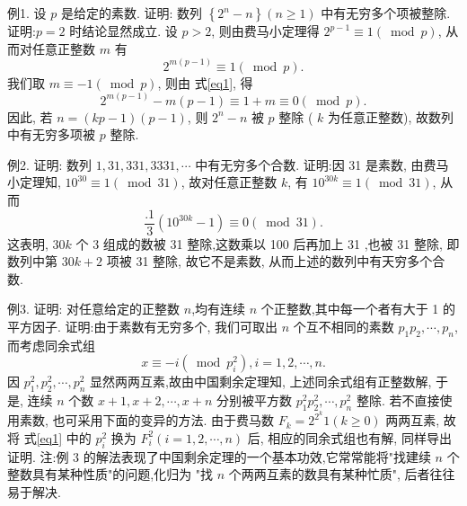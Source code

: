 例1. 设 $p$ 是给定的素数.
证明: 数列 $\left\{2^n-n\right\}(n \geqslant 1)$ 中有无穷多个项被整除.
证明:$p=2$ 时结论显然成立.
设 $p>2$, 则由费马小定理得 $2^{p-1} \equiv 1(\bmod p)$, 从而对任意正整数 $m$ 有
$$
2^{m(p-1)} \equiv 1(\bmod p) . \label{eq1}
$$
我们取 $m \equiv-1(\bmod p)$, 则由 式\ref{eq1}, 得
$$
2^{m(p-1)}-m(p-1) \equiv 1+m \equiv 0(\bmod p) .
$$
因此, 若 $n=(k p-1)(p-1)$, 则 $2^n-n$ 被 $p$ 整除 ( $k$ 为任意正整数), 故数列中有无穷多项被 $p$ 整除.



例2. 证明: 数列 $1,31,331,3331, \cdots$ 中有无穷多个合数.
证明:因 31 是素数, 由费马小定理知, $10^{30} \equiv 1(\bmod 31)$, 故对任意正整数 $k$, 有 $10^{30 k} \equiv 1(\bmod 31)$, 从而
$$
\frac{.1}{3}\left(10^{30 k}-1\right) \equiv 0(\bmod 31) .
$$
这表明, $30 k$ 个 3 组成的数被 31 整除,这数乘以 100 后再加上 31 ,也被 31 整除, 即数列中第 $30 k+2$ 项被 31 整除, 故它不是素数, 从而上述的数列中有天穷多个合数.



例3. 证明: 对任意给定的正整数 $n$,均有连续 $n$ 个正整数,其中每一个者有大于 1 的平方因子.
证明:由于素数有无穷多个, 我们可取出 $n$ 个互不相同的素数 $p_1 p_2, \cdots, p_n$, 而考虑同余式组
$$
x \equiv-i\left(\bmod p_i^2\right), i=1,2, \cdots, n . \label{eq1}
$$
因 $p_1^2, p_2^2, \cdots, p_n^2$ 显然两两互素,故由中国剩余定理知, 上述同余式组有正整数解, 于是, 连续 $n$ 个数 $x+1, x+2, \cdots, x+n$ 分别被平方数 $p_1^2 p_2^2, \cdots, p_n^2$ 整除.
若不直接使用素数, 也可采用下面的变异的方法.
由于费马数 $F_k=2^{2^k} 1(k \geqslant 0)$ 两两互素, 故将 式\ref{eq1} 中的 $p_i^2$ 换为 $F_i^2(i=1,2, \cdots, n)$ 后, 相应的同余式组也有解, 同样导出证明.
注:例 3 的解法表现了中国剩余定理的一个基本功效,它常常能将"找建续 $n$ 个整数具有某种性质"的问题,化归为 "找 $n$ 个两两互素的数具有某种忙质", 后者往往易于解决.



